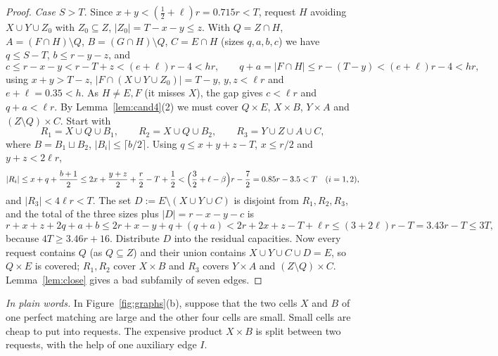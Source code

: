 \documentclass[11pt]{amsart}
\theoremstyle{definition}
\theoremstyle{remark}
\newcommand{\ceil}[1]{\lceil #1\rceil}
\begin{document}
\begin{proof}
\emph{Case $S>T$.} Since $x+y<(\tfrac12+\ell)r=0.715r<T$, request $H$ avoiding $X\cup Y\cup Z_0$ with $Z_0\subseteq Z$, $|Z_0|=T-x-y\le z$. With $Q=Z\cap H$, $A=(F\cap H)\setminus Q$, $B=(G\cap H)\setminus Q$, $C=E\cap H$ (sizes $q,a,b,c$) we have $q\le S-T$, $b\le r-y-z$, and
\[
c\le r-x-y<r-T+z<(e+\ell)r-4<hr,\qquad q+a=|F\cap H|\le r-(T-y)<(e+\ell)r-4<hr ,
\]
using $x+y>T-z$, $|F\cap(X\cup Y\cup Z_0)|=T-y$, $y,z<\ell r$ and $e+\ell=0.35<h$. As $H\ne E,F$ (it misses $X$), the gap gives $c<\ell r$ and $q+a<\ell r$. By Lemma~\ref{lem:cand4}(2) we must cover $Q\times E$, $X\times B$, $Y\times A$ and $(Z\setminus Q)\times C$. Start with
\[
R_1=X\cup Q\cup B_1,\qquad R_2=X\cup Q\cup B_2,\qquad R_3=Y\cup Z\cup A\cup C,
\]
where $B=B_1\sqcup B_2$, $|B_i|\le\ceil{b/2}$. Using $q\le x+y+z-T$, $x\le r/2$ and $y+z<2\ell r$,
\[
|R_i|\le x+q+\frac{b+1}{2}\le 2x+\frac{y+z}{2}+\frac r2-T+\frac12<\Bigl(\frac32+\ell-\beta\Bigr)r-\frac72=0.85r-3.5<T\quad(i=1,2),
\]
and $|R_3|<4\ell r<T$. The set $D:=E\setminus(X\cup Y\cup C)$ is disjoint from $R_1,R_2,R_3$, and the total of the three sizes plus $|D|=r-x-y-c$ is
\[
r+x+z+2q+a+b\le 2r+x-y+q+(q+a)<2r+2x+z-T+\ell r\le(3+2\ell)r-T=3.43r-T\le3T,
\]
because $4T\ge3.46r+16$. Distribute $D$ into the residual capacities. Now every request contains $Q$ (as $Q\subseteq Z$) and their union contains $X\cup Y\cup C\cup D=E$, so $Q\times E$ is covered; $R_1,R_2$ cover $X\times B$ and $R_3$ covers $Y\times A$ and $(Z\setminus Q)\times C$. Lemma~\ref{lem:close} gives a bad subfamily of seven edges.
\end{proof}

\noindent\emph{In plain words.} In Figure~\ref{fig:graphs}(b), suppose that the two cells $X$ and $B$ of one perfect matching are large and the other four cells are small. Small cells are cheap to put into requests. The expensive product $X\times B$ is split between two requests, with the help of one auxiliary edge $I$.
\end{document}
